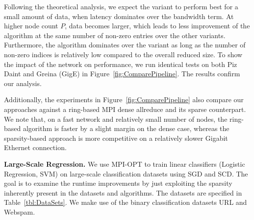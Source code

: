 \documentclass[11pt]{article}
\renewcommand{\paragraph}[1]{\vspace{0.1em} \noindent \textbf{#1}}
\begin{document}
Following the theoretical analysis, we expect the variant \ssarone{} to perform best for a small amount of data, when latency dominates over the bandwidth term. At higher node count $P$, data becomes larger, which leads to less improvement of the algorithm \ssarone{} at the same number of non-zero entries over the other variants. 
Furthermore, the algorithm  \ssartwo{} dominates over the \dsar{} variant as long as the number of non-zero indices is relatively low compared to the overall reduced size. 
To show the impact of the network on performance, we run identical tests on both Piz Daint and Greina (GigE) in Figure~\ref{fig:ComparePipeline}.
The results confirm our analysis. 

Additionally, the experiments in Figure~\ref{fig:ComparePipeline} also compare our approaches against a ring-based MPI dense allreduce and its sparse counterpart. We note that, on a fast network and relatively small number of nodes, the ring-based algorithm is faster by a slight margin on the dense case, whereas the sparsity-based approach is more competitive on a relatively slower Gigabit Ethernet connection. 





\paragraph{Large-Scale Regression.}
We use MPI-OPT to train linear classifiers (Logistic Regression, SVM) on large-scale classification datasets using SGD and SCD.
The goal is to examine the runtime improvements by just exploiting the sparsity inherently present in the datasets and algorithms.
The datasets are specified in Table~\ref{tbl:DataSets}. We make use of the binary classification datasets URL and Webspam.
\end{document}
